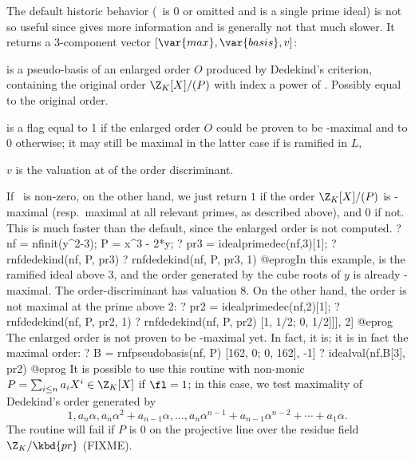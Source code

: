 The default historic behavior (\fl\ is 0 or omitted and  is a
single prime ideal) is not so useful since
 gives more information and is generally not that
much slower. It returns a 3-component vector $[\var{max}, \var{basis}, v]$:

\item {} is a pseudo-basis of an enlarged order $O$ produced by
Dedekind's criterion, containing the original order $\Z_K[X]/(P)$
with index a power of . Possibly equal to the original order.

\item {} is a flag equal to 1 if the enlarged order $O$
could be proven to be -maximal and to 0 otherwise; it may still be
maximal in the latter case if  is ramified in $L$,

\item $v$ is the valuation at  of the order discriminant.

If \fl\ is non-zero, on the other hand, we just return $1$ if the order
$\Z_K[X]/(P)$ is -maximal (resp.~maximal at all relevant primes, as
described above), and $0$ if not. This is much faster than the default,
since the enlarged order is not computed.
\bprog
? nf = nfinit(y^2-3); P = x^3 - 2*y;
? pr3 = idealprimedec(nf,3)[1];
? rnfdedekind(nf, P, pr3)
? rnfdedekind(nf, P, pr3, 1)
@eprog\noindent In this example,  is the ramified ideal above $3$,
and the order generated by the cube roots of $y$ is already
-maximal. The order-discriminant has valuation $8$. On the other
hand, the order is not maximal at the prime above 2:
\bprog
? pr2 = idealprimedec(nf,2)[1];
? rnfdedekind(nf, P, pr2, 1)
? rnfdedekind(nf, P, pr2)
     [1, 1/2; 0, 1/2]]], 2]
@eprog
The enlarged order is not proven to be -maximal yet. In fact, it
is; it is in fact the maximal order:
\bprog
? B = rnfpseudobasis(nf, P)
     [162, 0; 0, 162], -1]
? idealval(nf,B[3], pr2)
@eprog\noindent
It is possible to use this routine with non-monic
$P = \sum_{i\leq n} a_i X^i \in \Z_K[X]$ if $\fl = 1$;
in this case, we test maximality of Dedekind's order generated by
$$1, a_n \alpha, a_n\alpha^2 + a_{n-1}\alpha, \dots,
a_n\alpha^{n-1} + a_{n-1}\alpha^{n-2} + \cdots + a_1\alpha.$$
The routine will fail if $P$ is $0$ on the projective line over the residue
field $\Z_K/\kbd{pr}$ (FIXME).

